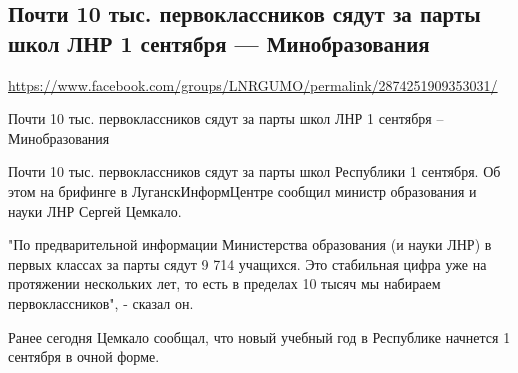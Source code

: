  
 
\subsection{Почти 10 тыс. первоклассников сядут за парты школ ЛНР 1 сентября --- Минобразования}
\url{https://www.facebook.com/groups/LNRGUMO/permalink/2874251909353031/}

Почти 10 тыс. первоклассников сядут за парты школ ЛНР 1 сентября –
Минобразования

Почти 10 тыс. первоклассников сядут за парты школ Республики 1 сентября. Об
этом на брифинге в ЛуганскИнформЦентре сообщил министр образования и науки ЛНР
Сергей Цемкало.

"По предварительной информации Министерства образования (и науки ЛНР) в первых
классах за парты сядут 9 714 учащихся. Это стабильная цифра уже на протяжении
нескольких лет, то есть в пределах 10 тысяч мы набираем первоклассников", -
сказал он.

Ранее сегодня Цемкало сообщал, что новый учебный год в Республике начнется 1
сентября в очной форме.
  

